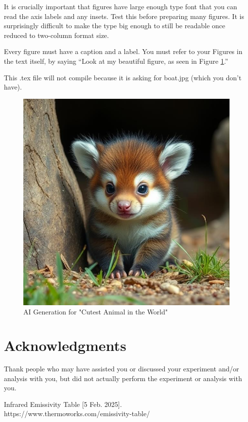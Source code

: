 \documentclass[aps,prb,twocolumn,groupedaddress,nofootinbib,floatfix]{revtex4}
\begin{document}
It is crucially important that figures have large enough type font that you can read the axis labels and any insets.   Test this before preparing many figures.   It is surprisingly difficult to make the type big enough to still be readable once reduced to two-column format size.

Every figure must have a caption and a label.  You must refer to your Figures in the text itself, by saying ``Look at my beautiful figure, as seen in Figure \ref{fig:Animal}.''

This .tex file will not compile because it is asking for boat.jpg (which you don't have).

\begin{figure}[ht!]
        \includegraphics[width=2 in]{cute.jpg}
        \caption{AI Generation for "Cutest Animal in the World"}
        \label{fig:Animal}
\end{figure}


\section*{Acknowledgments}
Thank people who may have assisted you or discussed your experiment and/or analysis with you, but did not actually perform the experiment or analysis with you.

\begin{thebibliography}{9}

  Infrared Emissivity Table [5 Feb. 2025]. https://www.thermoworks.com/emissivity-table/ 

\end{thebibliography}
\end{document}
